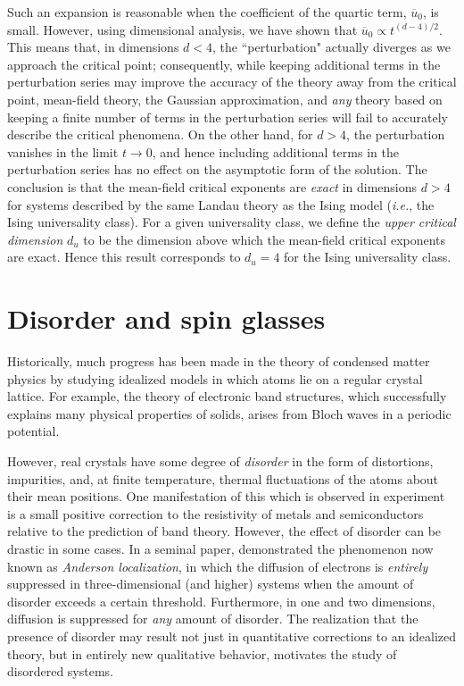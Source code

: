 Such an expansion is reasonable when the coefficient of the quartic term,
$\overline{u}_0$, is small. However, using dimensional analysis, we have shown
that $\overline{u}_0 \propto t^{(d-4)/2}$. This means that, in dimensions
$d<4$, the ``perturbation" actually diverges as we approach the critical point;
consequently, while keeping additional terms in the perturbation series may
improve the accuracy of the theory away from the critical point, mean-field
theory, the Gaussian approximation, and \emph{any} theory based on keeping a
finite number of terms in the perturbation series will fail to accurately
describe the critical phenomena. On the other hand, for $d>4$, the perturbation
vanishes in the limit $t \to 0$, and hence including additional terms in the
perturbation series has no effect on the asymptotic form of the solution. The
conclusion is that the mean-field critical exponents are \emph{exact} in
dimensions $d>4$ for systems described by the same Landau theory as the Ising
model (\textit{i.e.}, the Ising universality class). For a given universality
class, we define the \emph{upper critical dimension} $d_u$ to be the dimension
above which the mean-field critical exponents are exact. Hence this result
corresponds to $d_u=4$ for the Ising universality class.


\section{Disorder and spin glasses}

Historically, much progress has been made in the theory of condensed matter
physics by studying idealized models in which atoms lie on a regular crystal
lattice. For example, the theory of electronic band structures, which
successfully explains many physical properties of solids, arises from Bloch
waves in a periodic potential.

However, real crystals have some degree of \emph{disorder} in the form of
distortions, impurities, and, at finite temperature, thermal fluctuations of
the atoms about their mean positions. One manifestation of this which is
observed in experiment is a small positive correction to the resistivity of
metals and semiconductors relative to the prediction of band theory. However,
the effect of disorder can be drastic in some cases. In a seminal paper,
\textcite{anderson1958absence} demonstrated the phenomenon now known as
\emph{Anderson localization}, in which the diffusion of electrons is
\emph{entirely} suppressed in three-dimensional (and higher) systems when the
amount of disorder exceeds a certain threshold. Furthermore, in one and two
dimensions, diffusion is suppressed for \emph{any} amount of disorder. The
realization that the presence of disorder may result not just in quantitative
corrections to an idealized theory, but in entirely new qualitative behavior,
motivates the study of disordered systems.

